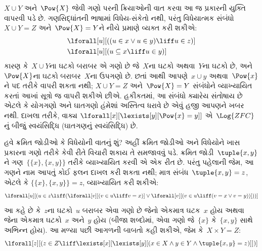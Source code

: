 $X\cup Y$ અને~$\Pow{X}$ જેવી ગણો પરની ક્રિયાઓની વાત કરવા આ જ પ્રકારની
યુક્તિ વાપરવી પડે છે. ગણસિદ્ધાંતની ભાષામાં વિધેય-સંકેતો નથી, પરંતુ
વિધેયાત્મક સંબંધો~$X\cup Y=Z$ અને~$\Pow{X}=Y$ને નીચે પ્રમાણે વ્યક્ત
કરી શકીએ:
\begin{align*}
& \lforall[u][((u \in x \lor u \in y) \liff u \in z)]\\
& \lforall[u][(u \subseteq x \liff u \in y )]
\end{align*}
કારણ કે~$X\cup Y$ના ઘટકો બરાબર એ ગણો છે જે~$X$ના
ઘટકો અથવા~$Y$ના ઘટકો છે, અને~$\Pow{X}$ના ઘટકો
બરાબર~$X$ના ઉપગણો છે.
છતાં આથી આપણે~$x\cup y$ અથવા~$\Pow{x}$ને પદ તરીકે વાપરી શકતા નથી;
$X\cup Y=Z$ અને~$\Pow{X}=Y$ સંબંધોને વ્યાખ્યાયિત કરતાં આખાં
સૂત્રો જ વાપરી શકીએ છીએ. હકીકતમાં, આ સંબંધો ક્યારેય સંતોષાય છે
એટલે કે યોગગણો અને ઘાતગણો હંમેશાં અસ્તિત્વ ધરાવે છે એવું હજી આપણને
ખબર નથી. દાખલા તરીકે, વાક્ય
$\lforall[x][\lexists[y][\Pow{x}=y]]$ એ~$\Log{ZFC}$નું બીજું
સ્વયંસિદ્ધિ (ઘાતગણનું સ્વયંસિદ્ધિ) છે.

હવે ક્રમિત જોડીઓ કે વિધેયોની વાતનું શું? અહીં ક્રમિત જોડીઓ અને
વિધેયોને ખાસ પ્રકારના ગણો તરીકે કેવી રીતે વિચારી શકાય તે સમજાવવું પડે.
ક્રમિત જોડી~$\tuple{x,y}$ને ગણ~$\{\{x\},\{x,y\}\}$ તરીકે વ્યાખ્યાયિત
કરવી એ એક રીત છે. પરંતુ પહેલાની જેમ, આ ગણને નામ આપતું કોઈ
ફલન દાખલ કરી શકતા નથી; માત્ર સંબંધ~$\tuple{x,y}=z$, એટલે કે
$\{\{x\},\{x,y\}\}=z$, વ્યાખ્યાયિત કરી શકીએ:
\[
\lforall[u][(u \in z \liff (\lforall[v][(v \in u \liff v = x)] \lor
  \lforall[v][(v \in u \liff (v = x \lor v = y))]))]
\]
આ કહે છે કે~$z$ના ઘટકો~$u$ બરાબર એવા ગણો છે જેનો એકમાત્ર
ઘટક~$x$ હોય અથવા જેના એકમાત્ર ઘટકો~$x$ અને~$y$ હોય
(બીજા શબ્દોમાં, એવા ગણો જે~$\{x\}$ કે~$\{x,y\}$ સાથે અભિન્ન હોય).
આ મળ્યા પછી આગળની બાબતો કહી શકીએ, જેમ કે~$X\times Y=Z$:
\[
\lforall[z][(z \in Z \liff \lexists[x][\lexists[y][(x \in
        X \land y \in Y \land \tuple{x, y} = z)]])]
\]

